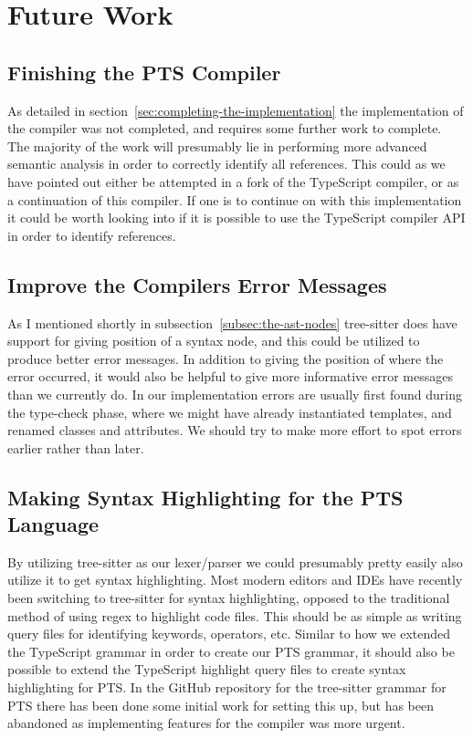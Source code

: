 \section{Future Work}\label{sec:future-work}

\subsection{Finishing the PTS Compiler}\label{subsec:finishing-the-pts-compiler}

As detailed in section~\vref{sec:completing-the-implementation} the implementation of the compiler was not completed, and requires some further work to complete.
The majority of the work will presumably lie in performing more advanced semantic analysis in order to correctly identify all references.
This could as we have pointed out either be attempted in a fork of the TypeScript compiler, or as a continuation of this compiler.
If one is to continue on with this implementation it could be worth looking into if it is possible to use the TypeScript compiler API in order to identify references.

\subsection{Improve the Compilers Error Messages}\label{subsec:compiler-with-focus-on-error-messages}

As I mentioned shortly in subsection~\vref{subsec:the-ast-nodes} tree-sitter does have support for giving position of a syntax node, and this could be utilized to produce better error messages.
In addition to giving the position of where the error occurred, it would also be helpful to give more informative error messages than we currently do.
In our implementation errors are usually first found during the type-check phase, where we might have already instantiated templates, and renamed classes and attributes.
We should try to make more effort to spot errors earlier rather than later.

\subsection{Making Syntax Highlighting for the PTS Language}\label{subsec:making-syntax-highligthing-for-the-pts-language}

By utilizing tree-sitter as our lexer/parser we could presumably pretty easily also utilize it to get syntax highlighting.
Most modern editors and IDEs have recently been switching to tree-sitter for syntax highlighting, opposed to the traditional method of using regex to highlight code files.
This should be as simple as writing query files for identifying keywords, operators, etc.
Similar to how we extended the TypeScript grammar in order to create our PTS grammar, it should also be possible to extend the TypeScript highlight query files to create syntax highlighting for PTS\@.
In the GitHub repository for the tree-sitter grammar for PTS there has been done some initial work for setting this up, but has been abandoned as implementing features for the compiler was more urgent.
